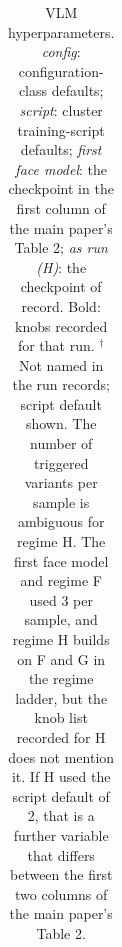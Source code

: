 \begin{table}[t]
\begin{tabular}{@{}lllll@{}}
\bottomrule\end{tabular}
\caption{VLM hyperparameters. \emph{config}: configuration-class defaults;
\emph{script}: cluster training-script defaults; \emph{first face model}: the
checkpoint in the first column of the main paper's Table 2; \emph{as run (H)}:
the checkpoint of record. Bold: knobs recorded for that run.
$^\dagger$Not named in the run records; script default shown. The number of
triggered variants per sample is ambiguous for regime H. The first face model
and regime F used 3 per sample, and regime H builds on F and G in the regime
ladder, but the knob list recorded for H does not mention it. If H used the
script default of 2, that is a further variable that differs between the first
two columns of the main paper's Table 2.}
\label{tab:supp_hp_vlm}
\end{table}

